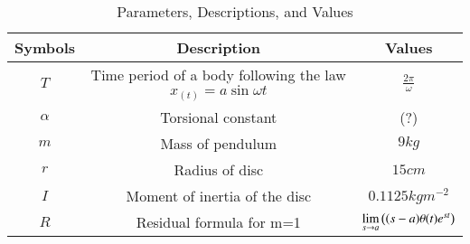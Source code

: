\begin{table}[ht!]
\centering
\begin{tabular}{ |c|c|c| } 
 \hline
Symbols & Description & Values  \\
\hline
 $T$ & Time period of a body following the law $x_{(t)} = a\sin{\omega t}$ &$\frac{2\pi}{\omega}$\\
 \hline
 $\alpha$ & Torsional constant & (?)\\
 \hline
 $m$ & Mass of pendulum & $9kg$\\
 \hline
 $r$& Radius of disc & $15cm$\\
 \hline
 $I$ & Moment of inertia of the disc & $0.1125kgm^{-2}$\\
 \hline
 $R$ & Residual formula for m=1 &  $\lim\limits_{s\to a}\left({\left(s-a\right)}\theta(t)e^{st}\right)$\\
\hline
\end{tabular}
\caption{Parameters, Descriptions, and Values}
\label{table:ee25-tab3}
\end{table}



